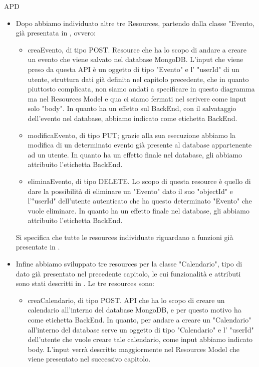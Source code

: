 \begin{listaPersonale} {APD}
\begin{listaPersonale2}[APD]{}
\begin{itemize}
            \item Dopo abbiamo individuato altre tre Resources, partendo dalla classe "Evento, già presentata in , ovvero:
                  \begin{itemize}
                      \item creaEvento, di tipo POST. Resource che ha lo scopo di andare a creare un evento che viene salvato nel database MongoDB. L'input che viene preso da questa API è un oggetto di tipo "Evento" e l' "userId" di un utente, struttura dati già definita nel capitolo precedente, che in quanto piuttosto complicata, non siamo andati a specificare in questo diagramma ma nel Resources Model e qua ci siamo fermati nel scrivere come input solo "body". In quanto ha un effetto sul BackEnd, con il salvataggio dell'evento nel database, abbiamo indicato come etichetta BackEnd.
                      \item modificaEvento, di tipo PUT; grazie alla sua esecuzione abbiamo la modifica di un determinato evento già presente al database appartenente ad un utente. In quanto ha un effetto finale nel database, gli abbiamo attribuito l'etichetta BackEnd.
                      \item eliminaEvento, di tipo DELETE. Lo scopo di questa resource è quello di dare la possibilità di eliminare un "Evento" dato il suo "objectId" e l'"userId" dell'utente autenticato che ha questo determinato "Evento" che vuole eliminare. In quanto ha un effetto finale nel database, gli abbiamo attribuito l'etichetta BackEnd.
                  \end{itemize}
                  Si specifica che tutte le resources individuate riguardano a funzioni già presentate in .
            \item Infine abbiamo sviluppato tre resources per la classe "Calendario", tipo di dato già presentato nel precedente capitolo, le cui funzionalità e attributi sono stati descritti in . Le tre resources sono:
                  \begin{itemize}
                      \item creaCalendario, di tipo POST. API che ha lo scopo di creare un calendario all'interno del database MongoDB, e per questo motivo ha come etichetta BackEnd. In quanto, per andare a creare un "Calendario" all'interno del database serve un oggetto di tipo "Calendario" e l' "userId" dell'utente che vuole creare tale calendario, come input abbiamo indicato body. L'input verrà descritto maggiormente nel Resources Model che viene presentato nel successivo capitolo.

\end{itemize}
\end{itemize}
\end{listaPersonale2}
\end{listaPersonale}
